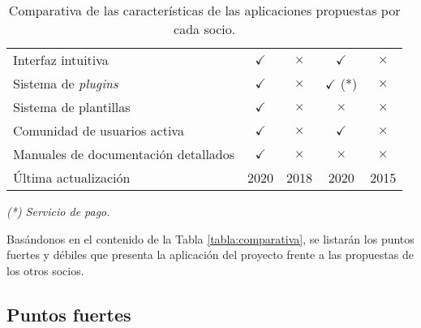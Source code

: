 \begin{table}[H]
\begin{tabular}{@{}lcccc@{}}
Interfaz intuitiva & \cellcolor{green!25} {$\checkmark$} & \cellcolor{red!25} {$\times$} & \cellcolor{green!25} {$\checkmark$} & \cellcolor{red!25} {$\times$}\tabularnewline
Sistema de \emph{plugins} & \cellcolor{green!25} {$\checkmark$} & \cellcolor{red!25} {$\times$} & \cellcolor{green!25} {$\checkmark$} (*) & \cellcolor{red!25} {$\times$}\tabularnewline
Sistema de plantillas & \cellcolor{green!25} {$\checkmark$} & \cellcolor{red!25} {$\times$} & \cellcolor{red!25} {$\times$} & \cellcolor{red!25} {$\times$}\tabularnewline
Comunidad de usuarios activa & \cellcolor{green!25} {$\checkmark$} & \cellcolor{red!25} {$\times$} & \cellcolor{green!25} {$\checkmark$} & \cellcolor{red!25} {$\times$}\tabularnewline
Manuales de documentación detallados & \cellcolor{green!25} {$\checkmark$} & \cellcolor{red!25} {$\times$} & \cellcolor{red!25} {$\times$} & \cellcolor{red!25} {$\times$}\tabularnewline
Última actualización & 2020 & 2018 & 2020 & 2015\tabularnewline
\bottomrule
\end{tabular}
\caption{Comparativa de las características de las aplicaciones propuestas por cada socio.}
\end{table}

\emph{(*) Servicio de pago.}

Basándonos en el contenido de la Tabla \ref{tabla:comparativa}, se listarán los
puntos fuertes y débiles que presenta la aplicación del proyecto frente
a las propuestas de los otros socios.


\subsection{Puntos fuertes}

